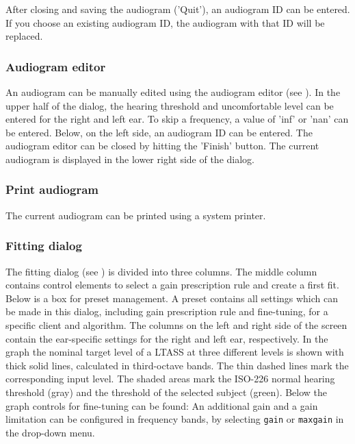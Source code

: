 \documentclass[11pt,a4paper,twoside]{article}
\newcommand{\+}{\discretionary{\mbox{\scriptsize$\hookleftarrow$}}{}{}}
\begin{document}
After closing and saving the audiogram ('Quit'), an audiogram ID can
be entered.
%
If you choose an existing audiogram ID, the audiogram with that ID will
be replaced.


\subsubsection*{Audiogram editor}

An audiogram can be manually edited using the audiogram editor (see
).
%
In the upper half of the dialog, the hearing threshold and
uncomfortable level can be entered for the right and left ear.
%
To skip a frequency, a value of 'inf' or 'nan' can be entered.
%
Below, on the left side, an audiogram ID can be entered.
%
The audiogram editor can be closed by hitting the 'Finish' button.
%
The current audiogram is displayed in the lower right side of the
dialog.


\subsubsection*{Print audiogram}

The current audiogram can be printed using a system printer.

\subsubsection*{Fitting dialog}

The fitting dialog (see ) is
divided into three columns. The middle column contains control
elements to select a gain prescription rule and create a first
fit. Below is a box for preset management. A preset contains all
settings which can be made in this dialog, including gain prescription
rule and fine-tuning, for a specific client and algorithm.  The
columns on the left and right side of the screen contain the
ear-specific settings for the right and left ear, respectively. In the
graph the nominal target level of a LTASS at three different levels is
shown with thick solid lines, calculated in third-octave bands. The
thin dashed lines mark the corresponding input level. The shaded areas
mark the ISO-226 normal hearing threshold (gray) and the threshold of
the selected subject (green). Below the graph controls for fine-tuning
can be found: An additional gain and a gain limitation can be
configured in frequency bands, by selecting \verb!gain! or
\verb!maxgain! in the drop-down menu.
\end{document}
